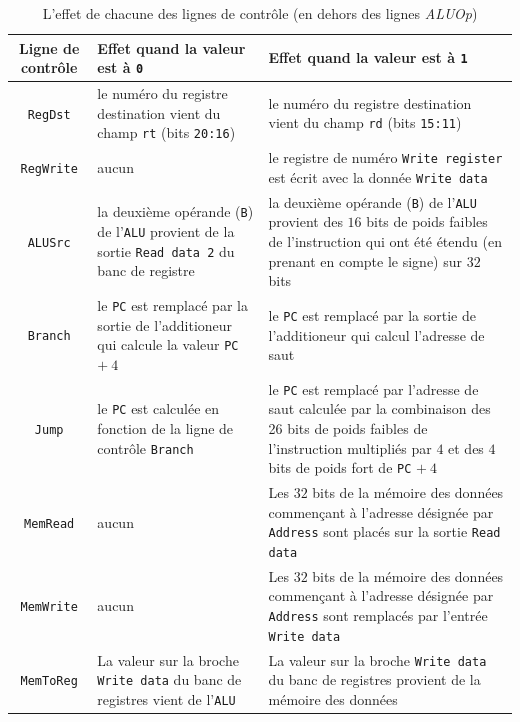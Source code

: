 \documentclass[12pt]{article}
\begin{document}
\begin{table}[!htpb]
\begin{center}
\begin{tabular}{|c|p{5.5cm}|p{5.5cm}|}
\hline
Ligne de contrôle & Effet quand la valeur est à \verb+0+ & Effet quand la valeur est à \verb+1+\\
\hline
\hline
\verb+RegDst+ & le numéro du registre destination vient du champ \verb+rt+ (bits \verb+20:16+) &
le numéro du registre destination vient du champ \verb+rd+ (bits \verb+15:11+)\\
\hline
\verb+RegWrite+ & aucun & le registre de numéro \verb+Write register+ est écrit avec la donnée \verb+Write data+\\
\hline
\verb+ALUSrc+ & la deuxième opérande (\verb+B+) de l'\verb+ALU+ provient de la sortie \verb+Read data 2+ du banc de registre &
la deuxième opérande (\verb+B+) de l'\verb+ALU+ provient des $16$ bits de poids faibles de l'instruction qui ont été étendu (en prenant en compte
le signe) sur $32$ bits\\
\hline
\verb+Branch+ & le \verb+PC+ est remplacé par la sortie de l'additioneur qui calcule la valeur \verb+PC+ $+\ 4$ &
le \verb+PC+ est remplacé par la sortie de l'additioneur qui calcul l'adresse de saut\\
\hline
\verb+Jump+ & le \verb+PC+ est calculée en fonction de la ligne de contrôle \verb+Branch+&
le \verb+PC+ est remplacé par l'adresse de saut calculée par la combinaison des 26 bits de poids faibles de l'instruction multipliés par $4$
et des $4$ bits de poids fort de \verb+PC+ $+\ 4$\\
\hline
\verb+MemRead+ & aucun & Les $32$ bits de la mémoire des données commençant à l'adresse désignée par \verb+Address+ sont placés
sur la sortie \verb+Read data+\\
\hline
\verb+MemWrite+ & aucun & Les $32$ bits de la mémoire des données commençant à l'adresse désignée par \verb+Address+ sont remplacés
par l'entrée \verb+Write data+\\
\hline
\verb+MemToReg+ & La valeur sur la broche \verb+Write data+ du banc de registres vient de l'\verb+ALU+ &
La valeur sur la broche \verb+Write data+ du banc de registres provient de la mémoire des données\\
\hline
\end{tabular}
\end{center}
\caption{L'effet de chacune des lignes de contrôle (en dehors des lignes \emph{ALUOp})}
\label{table:control-principal}
\end{table}
\end{document}
